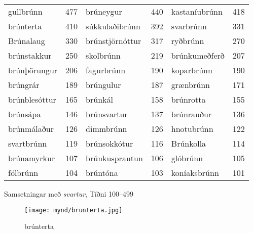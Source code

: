 \documentclass[../samsetningasafn.tex]{subfiles}
\begin{document}
\begin{wordlist}[H]
\begin{tcolorbox}

	\setlength{\extrarowheight}{3pt}
	\begin{tabular}{BlBlBl}
		gullbrúnn	& 477		& 		
		brúneygur	& 440		& 	
		kastaníubrúnn & 418		\\ 		
		brúnterta	& 410		& 		
		súkkulaðibrúnn &	392		& 	
		svarbrúnn	&	331		\\ 	
		Brúnalaug	&	330		& 	
		brúnstjörnóttur	& 317	& 	
		ryðbrúnn	& 270		\\ 		
		brúnstakkur	& 250		& 	
		skolbrúnn	& 219		& 
		brúnkumeðferð & 207		\\ 
		brúnþörungur	&	206	& 		
		fagurbrúnn	&	190 	& 	
		koparbrúnn	&	190 	\\ 	
		brúngrár		& 189		& 		
		brúngulur	& 187		& 	
		grænbrúnn	& 171		\\ 	
		brúnblesóttur & 165		& 		
		brúnkál		& 158		& 	
		brúnrotta	& 155		\\ 	
		brúnsápa	& 146		& 	
		brúnsvartur	& 137		& 
		brúnrauður	& 136		\\ 	
		brúnmálaður	& 126		& 
		dimmbrúnn	& 126		& 
		hnotubrúnn	& 122		\\ 	
		svartbrúnn	& 119		& 	
		brúnsokkótur & 116		& 	
		Brúnkolla	& 114		\\ 	
		brúnamyrkur & 107		& 
		brúnkusprautun & 106	& 	
		glóbrúnn	& 105		\\ 	
		fölbrúnn		& 104		& 	
		brúntóna	& 103		& 		
		koníaksbrúnn & 101		 	
\end{tabular}

\end{tcolorbox}
	\caption{Samsetningar með \textit{svartur}, Tíðni 100--499}
	\label{listi:svart.100}
\end{wordlist}

\begin{figure}[H]
\begin{tcolorbox}
\centering
	\texttt{[image: mynd/brunterta.jpg]}
\end{tcolorbox}
	\caption{brúnterta}
	\label{mynd:brunterta}
\end{figure}
\end{document}
